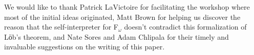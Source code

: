 \acks We would like to thank Patrick LaVictoire for facilitating the
workshop where most of the initial ideas originated, Matt Brown for
helping us discover the reason that the self-interpreter for
F$_\omega$ doesn't contradict this formalization of Lӧb's theorem, and
Nate Sores and Adam Chlipala for their timely and invaluable
suggestions on the writing of this paper.
